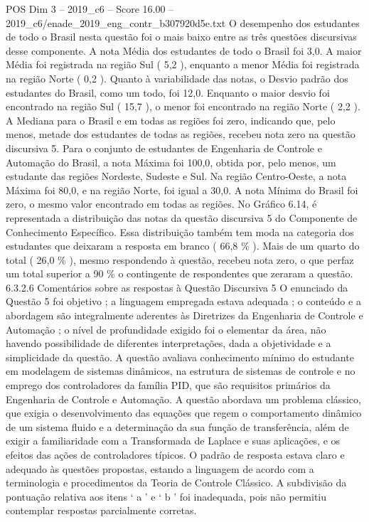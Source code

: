 \begin{textsample}{POS Dim 3 – 2019\_c6 – Score 16.00 – 2019\_c6/enade\_2019\_eng\_contr\_b307920d5e.txt}
O desempenho dos estudantes de todo o Brasil nesta questão foi o mais baixo entre as três questões discursivas desse componente.
A nota Média dos estudantes de todo o Brasil foi 3,0.
A maior Média foi registrada na região Sul ( 5,2 ), enquanto a menor Média foi registrada na região Norte ( 0,2 ).
Quanto à variabilidade das notas, o Desvio padrão dos estudantes do Brasil, como um todo, foi 12,0.
Enquanto o maior desvio foi encontrado na região Sul ( 15,7 ), o menor foi encontrado na região Norte ( 2,2 ).
A Mediana para o Brasil e em todas as regiões foi zero, indicando que, pelo menos, metade dos estudantes de todas as regiões, recebeu nota zero na questão discursiva 5.
Para o conjunto de estudantes de Engenharia de Controle e Automação do Brasil, a nota Máxima foi 100,0, obtida por, pelo menos, um estudante das regiões Nordeste, Sudeste e Sul.
Na região Centro-Oeste, a nota Máxima foi 80,0, e na região Norte, foi igual a 30,0.
A nota Mínima do Brasil foi zero, o mesmo valor encontrado em todas as regiões.
No Gráfico 6.14, é representada a distribuição das notas da questão discursiva 5 do Componente de Conhecimento Específico.
Essa distribuição também tem moda na categoria dos estudantes que deixaram a resposta em branco ( 66,8 \% ).
Mais de um quarto do total ( 26,0 \% ), mesmo respondendo à questão, recebeu nota zero, o que perfaz um total superior a 90 \% o contingente de respondentes que zeraram a questão. 6.3.2.6 Comentários sobre as respostas à Questão Discursiva 5 O enunciado da Questão 5 foi objetivo ; a linguagem empregada estava adequada ; o conteúdo e a abordagem são integralmente aderentes às Diretrizes da Engenharia de Controle e Automação ; o nível de profundidade exigido foi o elementar da área, não havendo possibilidade de diferentes interpretações, dada a objetividade e a simplicidade da questão.
A questão avaliava conhecimento mínimo do estudante em modelagem de sistemas dinâmicos, na estrutura de sistemas de controle e no emprego dos controladores da família PID, que são requisitos primários da Engenharia de Controle e Automação.
A questão abordava um problema clássico, que exigia o desenvolvimento das equações que regem o comportamento dinâmico de um sistema fluido e a determinação da sua função de transferência, além de exigir a familiaridade com a Transformada de Laplace e suas aplicações, e os efeitos das ações de controladores típicos.
O padrão de resposta estava claro e adequado às questões propostas, estando a linguagem de acordo com a terminologia e procedimentos da Teoria de Controle Clássico.
A subdivisão da pontuação relativa aos itens ‘ a ’ e ‘ b ’ foi inadequada, pois não permitiu contemplar respostas parcialmente corretas.

\end{textsample}
